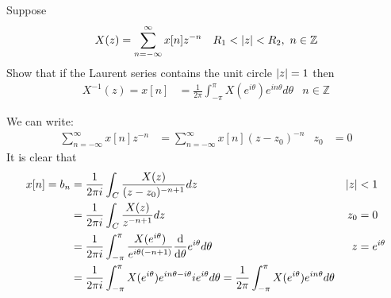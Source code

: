 \documentclass[12pt, english]{book}
\makeatletter
\renewenvironment{proof}[1][\proofname]{\par
	\pushQED{\qed}%
	\normalfont \topsep6\p@\@plus6\p@\relax
	\list{}{%
		\settowidth{\leftmargin}{\itshape\proofname:\hskip\labelsep}%
		\setlength{\labelwidth}{0pt}%
		\setlength{\itemindent}{-\leftmargin}%
	}%
	\item[\hskip\labelsep\itshape#1\@addpunct{:}]\ignorespaces
	}{ \popQED\endlist\@endpefalse}
\makeatother
\begin{document}
	\begin{example}[z-Transform]
		\label{z-Transform Inverse Derivation Example - Complex}
		Suppose 
		\begin{align*}
			X(z) &= \sum_{n=-\infty}^{\infty} x[n]z^{-n} & R_1 < \abs{z} < R_2, \ n \in \mathbb{Z}
		\end{align*}
		Show that if the Laurent series contains the unit circle \(\abs{z} = 1\) then 
		\begin{align*}
			X^{-1}(z) = x[n] 
			&= \frac{1}{2\pi} \int_{-\pi}^{\pi} X(e^{i\theta}) e^{in\theta} d\theta & n \in \mathbb{Z}
		\end{align*}
		\begin{proof}
			{\color{Grey}
			We can write:
			\begin{align*}
				\sum_{n=-\infty}^{\infty} x[n]z^{-n} 
				&= \sum_{n=-\infty}^{\infty} x[n](z-z_0)^{-n} & z_0 &= 0
			\end{align*}
			It is clear that
			\begin{align*}
				x[n] = b_n 
				&= \frac{1}{2\pi i} \int_{C} \frac{X(z)}{(z-z_0)^{-n+1}} dz 
					& \abs{z}&<1 \\
				&= \frac{1}{2\pi i} \int_{C} \frac{X(z)}{z^{-n+1}} dz
					& z_0 &= 0 \\
				&= \frac{1}{2\pi i} \int_{-\pi}^{\pi} \frac{X(e^{i\theta})}{e^{i\theta(-n+1)}} \dv{\theta} e^{i\theta}  d\theta
					& z &= e^{i\theta} \\
				&= \frac{1}{2\pi i} \int_{-\pi}^{\pi} X(e^{i\theta}) e^{i n\theta - i\theta}  i e^{i\theta}  d\theta 
				 = \frac{1}{2\pi} \int_{-\pi}^{\pi} X(e^{i\theta}) e^{i n\theta}  d\theta
			\end{align*}
			}
		\end{proof}
	\end{example}
\end{document}
